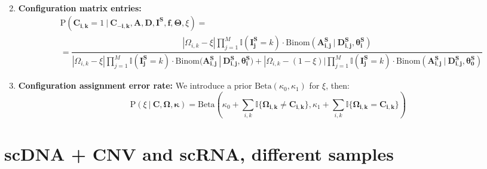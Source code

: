 \documentclass[11pt,a4paper,fullpage]{article}
\def\P{\mathrm{P}}
\theoremstyle{definition}
\theoremstyle{definition}
\theoremstyle{definition}
\numberwithin{equation}{section}
\begin{document}
\begin{enumerate}
\begin{equation}
\begin{aligned}
		\end{aligned}
		\end{equation}
		\item \textbf{Configuration matrix entries:}
		\begin{equation}
		\begin{aligned}
		&\P(\mathbf{C_{i,k}} = 1\ |\ \mathbf{C_{-i, k}}, \mathbf{A}, \mathbf{D}, \mathbf{I^{S}}, \mathbf{f}, \mathbf{\Theta}, \xi)	=\\
		&= \dfrac{| \Omega_{i,k} - \xi | \prod_{j=1}^{M} \mathbb{I}(\mathbf{I^{S}_{j}} = k) \cdot \mathrm{Binom}(\mathbf{A^{S}_{i,j}}\ |\ \mathbf{D^{S}_{i,j}}, \mathbf{\theta^{S}_{i}}) }{| \Omega_{i,k} - \xi | \prod_{j=1}^{M} \mathbb{I}(\mathbf{I^{S}_{j}} = k) \cdot \mathrm{Binom}(\mathbf{A^{S}_{i,j}}\ |\ \mathbf{D^{S}_{i,j}}, \mathbf{\theta^{S}_{i}}) + | \Omega_{i,k} - (1 - \xi) | \prod_{j=1}^{M} \mathbb{I}(\mathbf{I^{S}_{j}} = k) \cdot \mathrm{Binom}(\mathbf{A^{S}_{i,j}}\ |\ \mathbf{D^{S}_{i,j}}, \mathbf{\theta^{S}_{0}})}
		\end{aligned}		
		\end{equation}
		\item \textbf{Configuration assignment error rate:}
		We introduce a prior $\mathrm{Beta}(\kappa_{0}, \kappa_{1})$ for $ \xi $, then:
		\begin{equation}
		\P(\xi\ |\ \mathbf{C}, \mathbf{\Omega}, \mathbf{\kappa}) = \mathrm{Beta}\left (\kappa_{0} + \sum_{i,k} \mathbb{I}\{ \mathbf{\Omega_{i,k}} \neq \mathbf{C_{i,k}} \}, \kappa_{1} + \sum_{i,k} \mathbb{I}\{ \mathbf{\Omega_{i,k}} = \mathbf{C_{i,k}} \} \right )
		\end{equation}
	\end{enumerate}
	
	
	\section{scDNA + CNV and scRNA, different samples}
	
\end{document}
